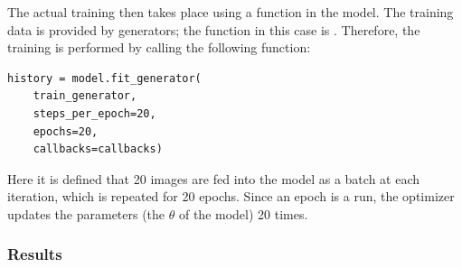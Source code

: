 The actual training then takes place using a  function in the model.
The training data is provided by generators; the function in this case is .
Therefore, the training is performed by calling the following function:

\begin{lstlisting}
history = model.fit_generator(
    train_generator,
    steps_per_epoch=20,
    epochs=20,
    callbacks=callbacks)
\end{lstlisting}

Here it is defined that 20 images are fed into the model as a batch at each iteration, which is repeated for 20 epochs.
Since an epoch is a run, the optimizer updates the parameters (the $\theta$ of the model) 20 times.

\subsubsection{Results}

